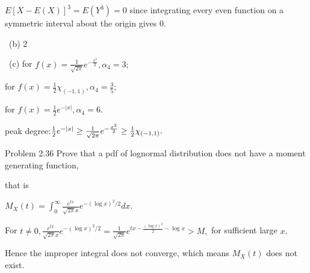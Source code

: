 \documentclass{article}
\begin{document}
$E\left[ X-E\left( X\right) \right] ^{3}=E\left( Y^{3}\right) =0$ since
integrating every even function on a symmetric interval about the origin
gives 0.

\qquad \qquad\ (b) 2

\qquad \qquad\ (c) for $f(x)=\frac{1}{\sqrt{2\pi }}e^{-\frac{x^{2}}{2}%
},\alpha _{4}=3;$

\qquad \qquad \qquad \qquad for $f(x)=\frac{1}{2}\chi _{(-1,1)},\alpha _{4}=%
\frac{3}{5};$

\qquad \qquad \qquad \qquad for $f(x)=\frac{1}{2}e^{-\left\vert x\right\vert
},\alpha _{4}=6.$

peak degree:$\frac{1}{2}e^{-\left\vert x\right\vert }\geq \frac{1}{\sqrt{%
2\pi }}e^{-\frac{x^{2}}{2}}\geq \frac{1}{2}\chi _{(-1,1)}.$

Problem 2.36 Prove that a pdf of lognormal distribution does not have a
moment generating function,

that is 

$M_{X}\left( t\right) =\int_{0}^{\infty }\frac{e^{tx}}{\sqrt{2\pi }x}%
e^{-\left( \log x\right) ^{2}/2}dx.$

For $t\neq 0,\frac{e^{tx}}{\sqrt{2\pi }x}e^{-\left( \log x\right) ^{2}/2}=%
\frac{1}{\sqrt{2\pi }}e^{tx-\frac{\left( \log x\right) ^{2}}{2}-\log x}>M,$
for sufficient large $x.$

Hence the improper integral does not converge, which means $M_{X}\left(
t\right) $ does not exist.
\end{document}
